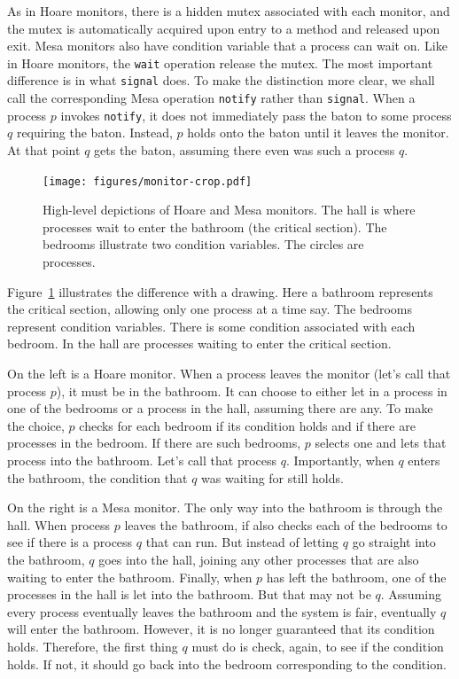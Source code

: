 \documentclass{report}
\begin{document}
As in Hoare monitors, there is a hidden mutex associated with each monitor,
and the mutex is automatically acquired upon entry to a method and released
upon exit.
Mesa monitors also have condition variable that a process can wait on.
Like in Hoare monitors, the \texttt{wait} operation release the mutex.
The most important difference is in what \texttt{signal} does.
To make the distinction more clear, we shall call the corresponding Mesa
operation \texttt{notify} rather than \texttt{signal}.
When a process $p$ invokes \texttt{notify}, it does not immediately pass 
the baton to some process $q$ requiring the baton.  Instead, $p$ holds onto
the baton until it leaves the monitor.  At that point $q$ gets the baton,
assuming there even was such a process $q$.

\begin{figure}
\begin{center}
\texttt{[image: figures/monitor-crop.pdf]}
\end{center}
\caption{High-level depictions of Hoare and Mesa monitors.  The hall is
where processes wait to enter the bathroom (the critical section).  The
bedrooms illustrate two condition variables.  The circles are processes.}
\label{fig:monitors}
\end{figure}

Figure~\ref{fig:monitors} illustrates the difference with a drawing.
Here a bathroom represents the critical section, allowing only one
process at a time say.  The bedrooms represent condition variables.
There is some condition associated with each bedroom.
In the hall are processes waiting to enter the critical section.

On the left is a Hoare monitor.  When a process leaves the monitor
(let's call that process $p$), it must be in the bathroom.
It can choose to either let in a process
in one of the bedrooms or a process in the hall, assuming there are any.
To make the choice, $p$ checks for each bedroom if its condition holds
and if there are processes in the bedroom.
If there are such bedrooms, $p$ selects one and lets that process into
the bathroom.  Let's call that process $q$.  Importantly, when $q$ enters
the bathroom, the condition that $q$ was waiting for still holds.

On the right is a Mesa monitor.  The only way into the bathroom is through
the hall.  When process $p$ leaves the bathroom,
if also checks each of the bedrooms to see if there is a process $q$ that
can run.  But instead of letting $q$ go straight into the bathroom, $q$
goes into the hall, joining any other processes that are also waiting to
enter the bathroom.  Finally, when $p$ has left the bathroom, one of the
processes in the hall is let into the bathroom.  But that may not be $q$.
Assuming every process eventually leaves the bathroom and the system is
fair, eventually $q$ will enter the bathroom.  However, it is no longer
guaranteed that its condition holds.  Therefore, the first thing $q$ must
do is check, again, to see if the condition holds.  If not, it should go back
into the bedroom corresponding to the condition.
\end{document}

